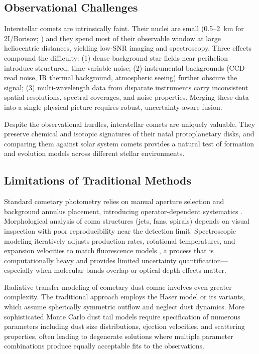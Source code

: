 \documentclass[preprint2]{aastex631}
\begin{document}
\subsection{Observational Challenges}

Interstellar comets are intrinsically faint. Their nuclei are small (0.5--2~km for 2I/Borisov; \citealt{jewitt20}) and they spend most of their observable window at large heliocentric distances, yielding low-SNR imaging and spectroscopy. Three effects compound the difficulty: (1) dense background star fields near perihelion introduce structured, time-variable noise; (2) instrumental backgrounds (CCD read noise, IR thermal background, atmospheric seeing) further obscure the signal; (3) multi-wavelength data from disparate instruments carry inconsistent spatial resolutions, spectral coverages, and noise properties. Merging these data into a single physical picture requires robust, uncertainty-aware fusion.

Despite the observational hurdles, interstellar comets are uniquely valuable. They preserve chemical and isotopic signatures of their natal protoplanetary disks, and comparing them against solar system comets provides a natural test of formation and evolution models across different stellar environments.

\subsection{Limitations of Traditional Methods}

Standard cometary photometry relies on manual aperture selection and background annulus placement, introducing operator-dependent systematics \citep{lamy04}. Morphological analysis of coma structures (jets, fans, spirals) depends on visual inspection with poor reproducibility near the detection limit. Spectroscopic modeling iteratively adjusts production rates, rotational temperatures, and expansion velocities to match fluorescence models \citep{ahearn95}, a process that is computationally heavy and provides limited uncertainty quantification---especially when molecular bands overlap or optical depth effects matter.

Radiative transfer modeling of cometary dust comae involves even greater complexity. The traditional approach employs the Haser model \citep{haser57} or its variants, which assume spherically symmetric outflow and neglect dust dynamics. More sophisticated Monte Carlo dust tail models \citep{fulle10} require specification of numerous parameters including dust size distributions, ejection velocities, and scattering properties, often leading to degenerate solutions where multiple parameter combinations produce equally acceptable fits to the observations.
\end{document}
